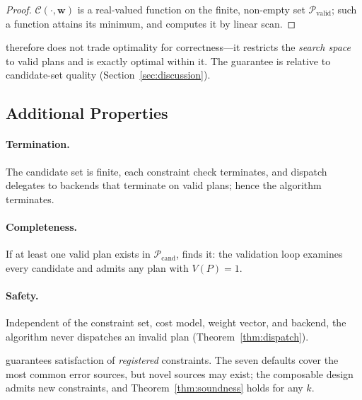 \begin{proof}
$\mathcal{C}(\cdot, \mathbf{w})$ is a real-valued function on the
finite, non-empty set $\mathcal{P}_{\text{valid}}$; such a function
attains its minimum, and \gate{} computes it by linear scan.
\end{proof}

\gate{} therefore does not trade optimality for correctness---it
restricts the \emph{search space} to valid plans and is exactly optimal
within it. The guarantee is relative to candidate-set quality
(Section~\ref{sec:discussion}).

\subsection{Additional Properties}

\paragraph{Termination.}
The candidate set is finite, each constraint check terminates, and
dispatch delegates to backends that terminate on valid plans; hence the
algorithm terminates.

\paragraph{Completeness.}
If at least one valid plan exists in $\mathcal{P}_{\text{cand}}$,
\gate{} finds it: the validation loop examines every candidate and
admits any plan with $V(P) = 1$.

\paragraph{Safety.}
Independent of the constraint set, cost model, weight vector, and
backend, the algorithm never dispatches an invalid plan
(Theorem~\ref{thm:dispatch}).

\begin{remark}
\gate{} guarantees satisfaction of \emph{registered} constraints. The
seven defaults cover the most common error sources, but novel sources
may exist; the composable design admits new constraints, and
Theorem~\ref{thm:soundness} holds for any $k$.
\end{remark}

